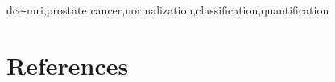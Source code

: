 \documentclass[review]{elsarticle}
\begin{document}
\begin{frontmatter}
\begin{keyword}
\acs*{dce}-\acs*{mri}\sep prostate cancer\sep normalization\sep classification\sep quantification
\end{keyword}

\end{frontmatter}

\acresetall
\linenumbers







\section*{References}


\end{document}

